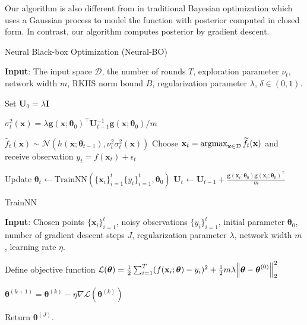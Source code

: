Our algorithm is also different from \citet{chowdhury2017kernelized} in traditional Bayesian optimization which uses a Gaussian process to model the function with posterior computed in closed form. In contrast, our algorithm computes posterior by gradient descent. 

\begin{algorithm}[]
\caption{Neural Black-box Optimization (Neural-BO)}
\label{alg:Neural-BO}
\textbf{Input}: The input space $\mathcal D$, the number of rounds $T$, exploration parameter $\nu_t$, network width $m$, RKHS norm bound $B$, regularization parameter $\lambda$, $\delta \in (0,1)$.
\begin{algorithmic}[1]
\State Set $\mathbf{U}_0 = \lambda \mathbf{I}$ 

\State $\sigma^2_t (\mathbf{x}) = \lambda \mathbf{g}(\mathbf{x};\boldsymbol{\theta}_0)^\top\mathbf{U}_{t-1}^{-1}\mathbf{g}(\mathbf{x};\boldsymbol{\theta}_0)/m$ \label{line:calculate_var}

\State $\widetilde{f_t}(\mathbf{x}) \sim \mathcal{N}(h(\mathbf{x}; \boldsymbol{\theta}_{t-1}), \nu_t^2 \sigma^2_t(\mathbf{x}))$ 
\State Choose $\mathbf{x}_t = \operatorname*{argmax}_{\mathbf{x} \in \mathcal{D}} \widetilde{f_t}(\mathbf{x}) $ and receive observation $y_t = f(\mathbf{x}_t) + \epsilon_t$ 
   
\State Update $\boldsymbol{\theta}_t \leftarrow \text{TrainNN}(\{\mathbf{x}_i\}^t_{i=1} \{y_i\}^t_{i=1}, \boldsymbol{\theta}_0)$ \label{line:train_NN}
\State $\mathbf{U}_t \leftarrow \mathbf{U}_{t-1} +  \frac{\mathbf{g}(\mathbf{x}_t;\boldsymbol{\theta}_0)\mathbf{g}(\mathbf{x}_t; \boldsymbol{\theta}_0)^\top}{m} $ \label{line:update_Ut}
\EndFor
\end{algorithmic}
\end{algorithm}

\begin{algorithm}[H]
\caption{TrainNN}
\label{alg:train_NN}
\textbf{Input}: Chosen points $\{\mathbf{x}_i\}^t_{i=1}$, noisy observations $\{y_i\}^t_{i=1}$, initial parameter $\boldsymbol{\theta}_0$, number of gradient descent steps $J$, regularization parameter $\lambda$, network width $m$, learning rate $\eta$.
\begin{algorithmic}[1]
\State Define objective function $\mathcal{L}(\boldsymbol{\theta})  = \frac{1}{2}\sum^T_{i=1} (f(\mathbf{x}_i; \boldsymbol{\theta}) - y_i)^2 + \frac{1}{2}m\lambda\norm{\boldsymbol{\theta} - \boldsymbol{\theta}^{(0)}}^2_2$

$\boldsymbol{\theta}^{(k+1)} = \boldsymbol{\theta}^{(k)} - \eta \nabla \mathcal{L}(\boldsymbol{\theta}^{(k)})$
\EndFor

\State Return $\boldsymbol{\theta}^{(J)}$.
\end{algorithmic}
\end{algorithm}



